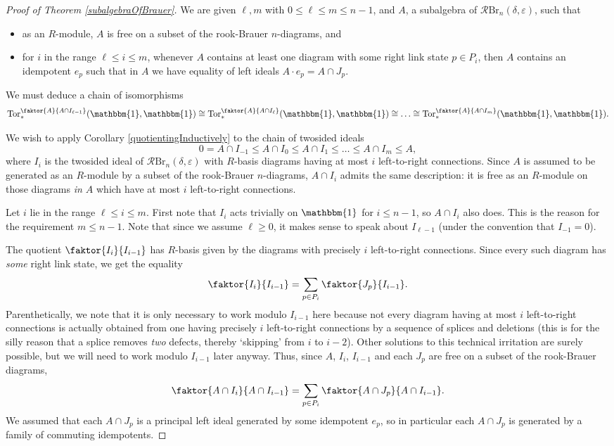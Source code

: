 \documentclass[12pt]{amsart}
\theoremstyle{plain}
\theoremstyle{definition} \newtheorem{definition}[theorem]{Definition}
\theoremstyle{plain}
\theoremstyle{plain} \newtheorem{proposition}[theorem]{Proposition}
\theoremstyle{plain} \newtheorem{conjecture}[theorem]{Conjecture}
\theoremstyle{plain} \newtheorem{corollary}[theorem]{Corollary}
\theoremstyle{remark} \newtheorem{claim}[theorem]{Claim}
\theoremstyle{remark} \newtheorem{remark}[theorem]{Remark}
\theoremstyle{remark} \newtheorem{example}[theorem]{Example}
\theoremstyle{remark} \newtheorem{comment}[theorem]{Comment}
\theoremstyle{definition} \newtheorem{question}[theorem]{Question}
\renewcommand{\t}{\mathbbm{1}}
\newcommand{\rook}{\mathcal{R}}
\newcommand{\Tor}{\mathrm{Tor}}
\newcommand{\Brauer}{\mathrm{Br}}
\newcommand{\mOne}{splice}
\newcommand{\mTwo}{deletion}
\begin{document}
\begin{proof}[Proof of Theorem \ref{subalgebraOfBrauer}] We are given $\ell, m$ with $0 \leq \ell \leq m \leq n-1$, and $A$, a subalgebra of $\rook \Brauer_n(\delta, \varepsilon)$, such that \begin{itemize}
    \item as an $R$-module, $A$ is free on a subset of the rook-Brauer $n$-diagrams, and
    \item for $i$ in the range $\ell \leq i \leq m$, whenever $A$ contains at least one diagram with some right link state $p \in P_i$, then $A$ contains an idempotent $e_p$ such that in $A$ we have equality of left ideals $A \cdot e_p = A \cap J_p$.
\end{itemize} We must deduce a chain of isomorphisms $$\Tor^{\faktor{A}{A \cap I_{\ell-1}}}_*(\t,\t) \cong \Tor^{\faktor{A}{A \cap I_{\ell}}}_*(\t,\t) \cong \dots \cong \Tor^{\faktor{A}{A \cap I_{m}}}_*(\t,\t).$$

We wish to apply Corollary \ref{quotientingInductively} to the chain of twosided ideals $$0 = A \cap I_{-1} \leq A \cap I_0 \leq A \cap I_1 \leq \dots \leq A \cap I_{m} \leq A,$$ where $I_i$ is the twosided ideal of $\rook \Brauer_n(\delta, \varepsilon)$ with $R$-basis diagrams having at most $i$ left-to-right connections. Since $A$ is assumed to be generated as an $R$-module by a subset of the rook-Brauer $n$-diagrams, $A \cap I_i$ admits the same description: it is free as an $R$-module on those diagrams \emph{in $A$} which have at most $i$ left-to-right connections.

Let $i$ lie in the range $\ell \leq i \leq m$. First note that $I_i$ acts trivially on $\t$ for $i \leq n-1$, so $A \cap I_i$ also does. This is the reason for the requirement $m \leq n-1$. Note that since we assume $\ell \geq 0$, it makes sense to speak about $I_{\ell-1}$ (under the convention that $I_{-1}=0$).

The quotient $\faktor{I_i}{I_{i-1}}$ has $R$-basis given by the diagrams with precisely $i$ left-to-right connections. Since every such diagram has \emph{some} right link state, we get the equality $$\faktor{I_i}{I_{i-1}} = \sum_{p \in P_i} \faktor{J_p}{I_{i-1}}.$$ Parenthetically, we note that it is only necessary to work modulo $I_{i-1}$ here because not every diagram having at most $i$ left-to-right connections is actually obtained from one having precisely $i$ left-to-right connections by a sequence of {\mOne}s and {\mTwo}s (this is for the silly reason that a {\mOne} removes \emph{two} defects, thereby `skipping' from $i$ to $i-2$). Other solutions to this technical irritation are surely possible, but we will need to work modulo $I_{i-1}$ later anyway. Thus, since $A$, $I_i$, $I_{i-1}$ and each $J_p$ are free on a subset of the rook-Brauer diagrams, $$\faktor{A \cap I_i}{A \cap I_{i-1}} = \sum_{p \in P_i} \faktor{A \cap J_p}{A \cap I_{i-1}}.$$ We assumed that each $A \cap J_p$ is a principal left ideal generated by some idempotent $e_p$, so in particular each $A \cap J_p$ is generated by a family of commuting idempotents.


\end{proof}
\end{document}
